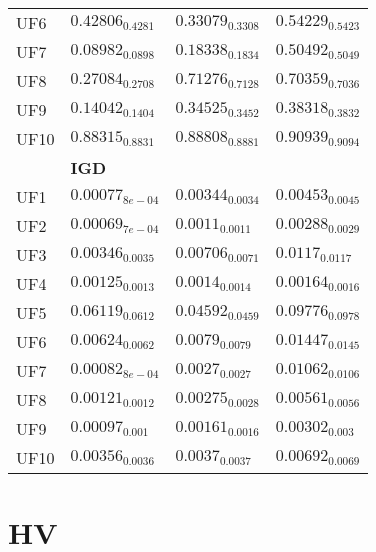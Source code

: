 \documentclass{article}
\begin{document}
\begin{table}[!h]
\begin{scriptsize}
\begin{tabular}{llll}
UF6 & \cellcolor{gray25}$0.42806_{0.4281}$ & \cellcolor{gray95}$0.33079_{0.3308}$ & $0.54229_{0.5423}$ \\
UF7 & \cellcolor{gray95}$0.08982_{0.0898}$ & \cellcolor{gray25}$0.18338_{0.1834}$ & $0.50492_{0.5049}$ \\
UF8 & \cellcolor{gray95}$0.27084_{0.2708}$ & $0.71276_{0.7128}$ & \cellcolor{gray25}$0.70359_{0.7036}$ \\
UF9 & \cellcolor{gray95}$0.14042_{0.1404}$ & \cellcolor{gray25}$0.34525_{0.3452}$ & $0.38318_{0.3832}$ \\
UF10 & \cellcolor{gray95}$0.88315_{0.8831}$ & \cellcolor{gray25}$0.88808_{0.8881}$ & $0.90939_{0.9094}$ \\
\hline
& \textbf{\small IGD}\\
\hline 
UF1 & \cellcolor{gray95}$0.00077_{8e-04}$ & \cellcolor{gray25}$0.00344_{0.0034}$ & $0.00453_{0.0045}$ \\
UF2 & \cellcolor{gray95}$0.00069_{7e-04}$ & \cellcolor{gray25}$0.0011_{0.0011}$ & $0.00288_{0.0029}$ \\
UF3 & \cellcolor{gray95}$0.00346_{0.0035}$ & \cellcolor{gray25}$0.00706_{0.0071}$ & $0.0117_{0.0117}$ \\
UF4 & \cellcolor{gray95}$0.00125_{0.0013}$ & \cellcolor{gray25}$0.0014_{0.0014}$ & $0.00164_{0.0016}$ \\
UF5 & \cellcolor{gray25}$0.06119_{0.0612}$ & \cellcolor{gray95}$0.04592_{0.0459}$ & $0.09776_{0.0978}$ \\
UF6 & \cellcolor{gray95}$0.00624_{0.0062}$ & \cellcolor{gray25}$0.0079_{0.0079}$ & $0.01447_{0.0145}$ \\
UF7 & \cellcolor{gray95}$0.00082_{8e-04}$ & \cellcolor{gray25}$0.0027_{0.0027}$ & $0.01062_{0.0106}$ \\
UF8 & \cellcolor{gray95}$0.00121_{0.0012}$ & \cellcolor{gray25}$0.00275_{0.0028}$ & $0.00561_{0.0056}$ \\
UF9 & \cellcolor{gray95}$0.00097_{0.001}$ & \cellcolor{gray25}$0.00161_{0.0016}$ & $0.00302_{0.003}$ \\
UF10 & \cellcolor{gray95}$0.00356_{0.0036}$ & \cellcolor{gray25}$0.0037_{0.0037}$ & $0.00692_{0.0069}$ \\
\hline
\hline
\end{tabular}
\end{scriptsize}
\end{table}



\newpage
\section{HV}
\end{document}
